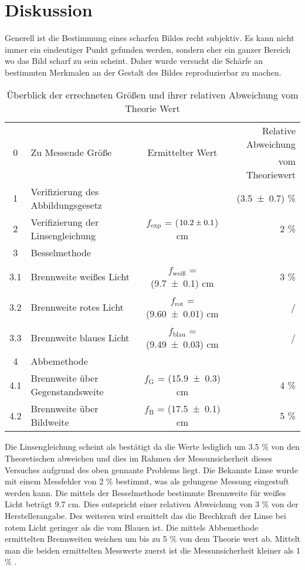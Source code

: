 \section{Diskussion}
\label{sec:Diskussion}
Generell ist die Bestimmung eines scharfen Bildes recht subjektiv. Es kann nicht immer ein eindeutiger Punkt gefunden werden, sondern eher ein ganzer Bereich wo das Bild scharf zu sein scheint. Daher wurde versucht die Schärfe an bestimmten Merkmalen an der Gestalt des Bildes reproduzierbar zu machen.
\begin{table}
  \centering
  \begin{tabular}{c| l | c |r}
    \toprule
    \multirow{2}{*}{0} & \multirow{2}{*}{Zu Messende Größe} & \multirow{2}{*}{Ermittelter Wert} & Relative Abweichung \\
 	& & & vom Theoriewert \\
    \midrule
    	1 & Verifizierung des Abbildungsgesetz & & (\num{3.5 +- 0.7}) \% \\
	2 & Verifizierung der Linsengleichung & $f_\text{exp}$ = ($\num{10.2 +- 0.1}$) cm & 2 \% \\
	3 & Besselmethode & & \\
	3.1 &Brennweite weißes Licht & $f_\text{weiß}$ = (\num{9.7 +- 0.1}) cm & 3 \% \\
	3.2 &Brennweite rotes Licht  & $f_\text{rot}$  = (\num{9.60 +- 0.01}) cm & / \\
	3.3 &Brennweite blaues Licht & $f_\text{blau}$ = (\num{9.49 +- 0.03}) cm & / \\
	4 & Abbemethode & & \\
	4.1 & Brennweite über Gegenstandsweite& $f_\text{G}$ = (\num{15.9 +- 0.3}) cm &  4 \% \\
	4.2 & Brennweite über Bildweite & $f_\text{B}$ = (\num{17.5 +- 0.1}) cm & 5 \% \\
    \bottomrule
  \end{tabular}
  \caption{Überblick der errechneten Größen und ihrer relativen Abweichung vom Theorie Wert}
  \label{tab:über}
\end{table}
Die Linsengleichung scheint als bestätigt da die Werte lediglich um 3.5 \% von den Theoretischen abweichen und dies im Rahmen der Messunsicherheit dieses Versuches aufgrund des oben gennante Problems liegt.
Die Bekannte Linse wurde mit einem Messfehler von 2 \% bestimmt, was als gelungene Messung eingestuft werden kann.
Die mittels der Besselmethode bestimmte Brennweite für weißes Licht beträgt 9.7 cm. Dies entspricht einer relativen Abweichung von 3 \% von der Herstellerangabe. Des weiteren wird ermittelt das die Brechkraft der Linse bei rotem Licht geringer als die vom Blauen ist.
Die mittels Abbemethode ermittelten Brennweiten weichen um bis zu 5 \% von dem Theorie wert ab. Mittelt man die beiden ermittelten Messwerte zuerst ist die Messunsicherheit kleiner als 1 \% .
